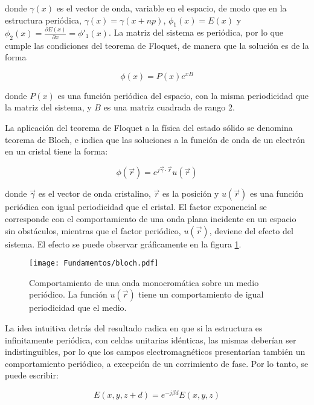 donde $\gamma(x)$ es el vector de onda, variable en el espacio, de modo que en la estructura periódica, $\gamma(x) = \gamma(x+n p)$, $\phi_1(x) = E(x)$ y $\phi_2(x) = \frac{\partial E(x)}{\partial x} = \phi'_1(x)$. La matriz del sistema es periódica, por lo que cumple las condiciones del teorema de Floquet, de manera que la solución es de la forma

\begin{equation}
	\phi(x) = P(x) e^{xB}
\end{equation}

donde $P(x)$ es una función periódica del espacio, con la misma periodicidad que la matriz del sistema, y $B$ es una matriz cuadrada de rango 2.

La aplicación del teorema de Floquet a la física del estado sólido se denomina teorema de Bloch, e indica que las soluciones a la función de onda de un electrón en un cristal tiene la forma:

\begin{equation}
\phi(\vec{r}) = e^{j\vec{\gamma} \cdot \vec{r}} u(\vec{r})
\end{equation}

donde $\vec{\gamma}$ es el vector de onda cristalino, $\vec{r}$ es la posición y $u(\vec{r})$ es una función periódica con igual periodicidad que el cristal. El factor exponencial se corresponde con el comportamiento de una onda plana incidente en un espacio sin obstáculos, mientras que el factor periódico, $u(\vec{r})$, deviene del efecto del sistema. El efecto se puede observar gráficamente en la figura \ref{fig:bloch-periodico-1d}.

\begin{figure}[htp]
	\centering
	\texttt{[image: Fundamentos/bloch.pdf]}
	\caption{Comportamiento de una onda monocromática sobre un medio periódico. La función $u(\vec{r})$ tiene un comportamiento de igual periodicidad que el medio.}
	\label{fig:bloch-periodico-1d}
\end{figure}

La idea intuitiva detrás del resultado radica en que si la estructura es infinitamente periódica, con celdas unitarias idénticas, las mismas deberían ser indistinguibles, por lo que los campos electromagnéticos presentarían también un comportamiento periódico, a excepción de un corrimiento de fase. Por lo tanto, se puede escribir:

\begin{equation}
	\label{eq:comportamiento-periodico-campo-bloch}
	E(x,y,z+d) = e^{-j \beta d} E(x,y,z)
\end{equation}

